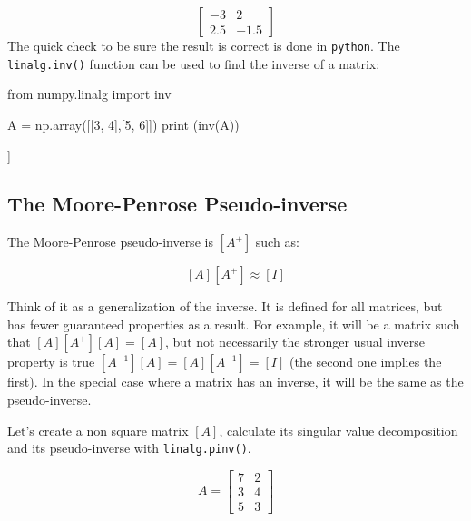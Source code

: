 \[
\begin{bmatrix}
−3 & 2\\
2.5 & −1.5
\end{bmatrix}
\]
The quick check to be sure the result is correct is done in \texttt{python}. The \texttt{linalg.inv()} function can be used to find the inverse of a matrix:

\begin{ipython}
from numpy.linalg import inv

A = np.array([[3, 4],[5, 6]])	
print (inv(A))
\end{ipython}
\begin{ioutput}
[[-3.   2. ]
 [ 2.5 -1.5]]
\end{ioutput}

\subsection{The Moore-Penrose Pseudo-inverse}
\label{sec:the-moore-penrose-pseudoinverse}

The Moore-Penrose pseudo-inverse is \([A^+]\) such as:

\[[A][A^+]≈[I]\]

Think of it as a generalization of the inverse. It is defined for all matrices, but has fewer guaranteed properties as a result. For example, it will be a matrix such that \([𝐴][𝐴^+][𝐴]=[𝐴]\), but not necessarily the stronger usual inverse property is true \([𝐴^{−1}][𝐴]=[𝐴][𝐴^{−1}]=[𝐼]\) (the second one implies the first). In the special case where a matrix has an inverse, it will be the same as the pseudo-inverse.



Let's create a non square matrix $[A]$, calculate its singular value decomposition and its pseudo-inverse with  \texttt{linalg.pinv()}.

\[A=\begin{bmatrix}
7&2\\
3&4\\
5&3\end{bmatrix}\]

